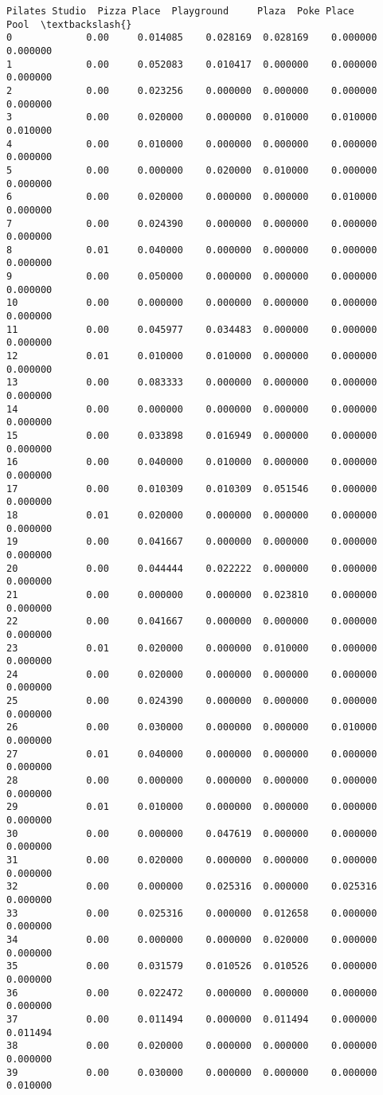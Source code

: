 \documentclass[11pt]{article}
\begin{document}
\begin{tcolorbox}[breakable, size=fbox, boxrule=.5pt, pad at break*=1mm, opacityfill=0]
\begin{Verbatim}[commandchars=\\\{\}]
    Pilates Studio  Pizza Place  Playground     Plaza  Poke Place      Pool  \textbackslash{}
0             0.00     0.014085    0.028169  0.028169    0.000000  0.000000
1             0.00     0.052083    0.010417  0.000000    0.000000  0.000000
2             0.00     0.023256    0.000000  0.000000    0.000000  0.000000
3             0.00     0.020000    0.000000  0.010000    0.010000  0.010000
4             0.00     0.010000    0.000000  0.000000    0.000000  0.000000
5             0.00     0.000000    0.020000  0.010000    0.000000  0.000000
6             0.00     0.020000    0.000000  0.000000    0.010000  0.000000
7             0.00     0.024390    0.000000  0.000000    0.000000  0.000000
8             0.01     0.040000    0.000000  0.000000    0.000000  0.000000
9             0.00     0.050000    0.000000  0.000000    0.000000  0.000000
10            0.00     0.000000    0.000000  0.000000    0.000000  0.000000
11            0.00     0.045977    0.034483  0.000000    0.000000  0.000000
12            0.01     0.010000    0.010000  0.000000    0.000000  0.000000
13            0.00     0.083333    0.000000  0.000000    0.000000  0.000000
14            0.00     0.000000    0.000000  0.000000    0.000000  0.000000
15            0.00     0.033898    0.016949  0.000000    0.000000  0.000000
16            0.00     0.040000    0.010000  0.000000    0.000000  0.000000
17            0.00     0.010309    0.010309  0.051546    0.000000  0.000000
18            0.01     0.020000    0.000000  0.000000    0.000000  0.000000
19            0.00     0.041667    0.000000  0.000000    0.000000  0.000000
20            0.00     0.044444    0.022222  0.000000    0.000000  0.000000
21            0.00     0.000000    0.000000  0.023810    0.000000  0.000000
22            0.00     0.041667    0.000000  0.000000    0.000000  0.000000
23            0.01     0.020000    0.000000  0.010000    0.000000  0.000000
24            0.00     0.020000    0.000000  0.000000    0.000000  0.000000
25            0.00     0.024390    0.000000  0.000000    0.000000  0.000000
26            0.00     0.030000    0.000000  0.000000    0.010000  0.000000
27            0.01     0.040000    0.000000  0.000000    0.000000  0.000000
28            0.00     0.000000    0.000000  0.000000    0.000000  0.000000
29            0.01     0.010000    0.000000  0.000000    0.000000  0.000000
30            0.00     0.000000    0.047619  0.000000    0.000000  0.000000
31            0.00     0.020000    0.000000  0.000000    0.000000  0.000000
32            0.00     0.000000    0.025316  0.000000    0.025316  0.000000
33            0.00     0.025316    0.000000  0.012658    0.000000  0.000000
34            0.00     0.000000    0.000000  0.020000    0.000000  0.000000
35            0.00     0.031579    0.010526  0.010526    0.000000  0.000000
36            0.00     0.022472    0.000000  0.000000    0.000000  0.000000
37            0.00     0.011494    0.000000  0.011494    0.000000  0.011494
38            0.00     0.020000    0.000000  0.000000    0.000000  0.000000
39            0.00     0.030000    0.000000  0.000000    0.000000  0.010000


\end{Verbatim}
\end{tcolorbox}
\end{document}
